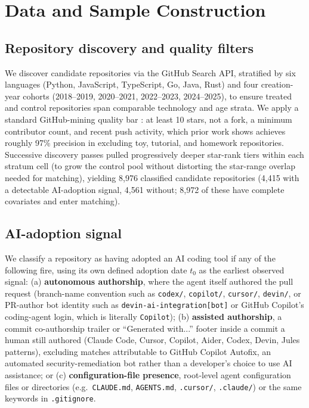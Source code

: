 \documentclass[12pt]{article}
\begin{document}
\section{Data and Sample Construction}
\label{sec:data}

\subsection{Repository discovery and quality filters}

We discover candidate repositories via the GitHub Search API, stratified
by six languages (Python, JavaScript, TypeScript, Go, Java, Rust) and four
creation-year cohorts (2018--2019, 2020--2021, 2022--2023, 2024--2025), to
ensure treated and control repositories span comparable technology and
age strata. We apply a standard GitHub-mining quality bar
\cite{munaiah2017curating}: at least 10 stars, not a fork, a minimum
contributor count, and recent push activity, which prior work shows
achieves roughly 97\% precision in excluding toy, tutorial, and homework
repositories. Successive discovery passes pulled progressively deeper
star-rank tiers within each stratum cell (to grow the control pool without
distorting the star-range overlap needed for matching), yielding 8,976
classified candidate repositories (4,415 with a detectable AI-adoption
signal, 4,561 without; 8,972 of these have complete covariates and enter
matching).

\subsection{AI-adoption signal}

We classify a repository as having adopted an AI coding tool if any of the
following fire, using its own defined adoption date $t_0$ as the earliest
observed signal: (a) \textbf{autonomous authorship}, where the agent
itself authored the pull request (branch-name convention such as
\texttt{codex/}, \texttt{copilot/}, \texttt{cursor/}, \texttt{devin/}, or
PR-author bot identity such as \texttt{devin-ai-integration[bot]} or
GitHub Copilot's coding-agent login, which is literally \texttt{Copilot});
(b) \textbf{assisted authorship}, a commit co-authorship trailer or
``Generated with...''  footer inside a commit a human still authored
(Claude Code, Cursor, Copilot, Aider, Codex, Devin, Jules patterns),
excluding matches attributable to GitHub Copilot Autofix, an automated
security-remediation bot rather than a developer's choice to use AI
assistance; or (c) \textbf{configuration-file presence}, root-level agent
configuration files or directories (e.g.\ \texttt{CLAUDE.md},
\texttt{AGENTS.md}, \texttt{.cursor/}, \texttt{.claude/}) or the same
keywords in \texttt{.gitignore}.
\end{document}
